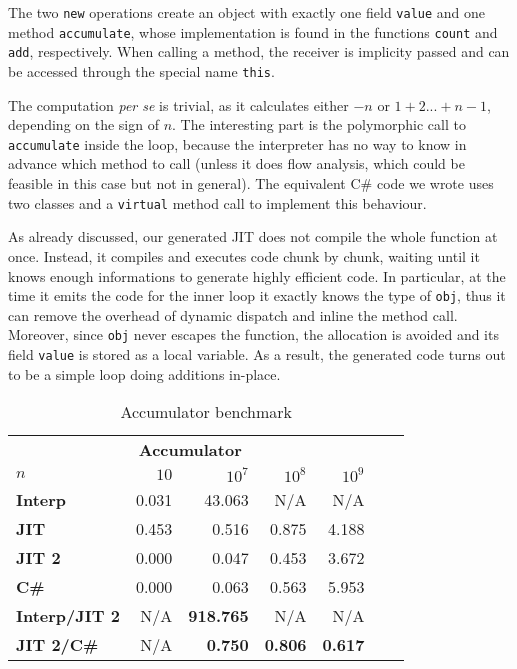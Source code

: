 The two \lstinline{new} operations create an object with exactly one field
\lstinline{value} and one method \lstinline{accumulate}, whose implementation
is found in the functions \lstinline{count} and \lstinline{add}, respectively.
When calling a method, the receiver is implicity passed and can be accessed
through the special name \lstinline{this}.

The computation \emph{per se} is trivial, as it calculates either $-n$ or
$1+2...+n-1$, depending on the sign of $n$. The interesting part is the
polymorphic call to \lstinline{accumulate} inside the loop, because the interpreter has
no way to know in advance which method to call (unless it does flow analysis,
which could be feasible in this case but not in general).  The equivalent C\#
code we wrote uses two classes and a \lstinline{virtual} method call to
implement this behaviour.

As already discussed, our generated JIT does not compile the whole function at
once. Instead, it compiles and executes code chunk by chunk, waiting until it
knows enough informations to generate highly efficient code.  In particular,
at the time it emits the code for the inner loop it exactly knows the
type of \lstinline{obj}, thus it can remove the overhead of dynamic dispatch
and inline the method call.  Moreover, since \lstinline{obj} never escapes the
function, the allocation is avoided and its field \lstinline{value} is stored
as a local variable.  As a result, the generated code turns out to be a simple loop
doing additions in-place.

\begin{table}[ht]
  \begin{center}

  \begin{tabular}{l|rrrrrr}
    \multicolumn{5}{c}{\textbf{Accumulator}} \\ [0.5ex]

    \textbf{$n$}          & $10$  & $10^7$           & $10^8$         & $10^9$         \\
    \hline
    \textbf{Interp}       & 0.031 & 43.063           & N/A            & N/A            \\
    \textbf{JIT}          & 0.453 &  0.516           & 0.875          & 4.188          \\
    \textbf{JIT 2}        & 0.000 &  0.047           & 0.453          & 3.672          \\
    \textbf{C\#}          & 0.000 &  0.063           & 0.563          & 5.953          \\
    \textbf{Interp/JIT 2} & N/A   & \textbf{918.765} & N/A            & N/A            \\
    \textbf{JIT 2/C\#}    & N/A   & \textbf{0.750}   & \textbf{0.806} & \textbf{0.617} \\

  \end{tabular}
  \end{center}
  \caption{Accumulator benchmark}
  \label{tab:accumulator}
\end{table}





